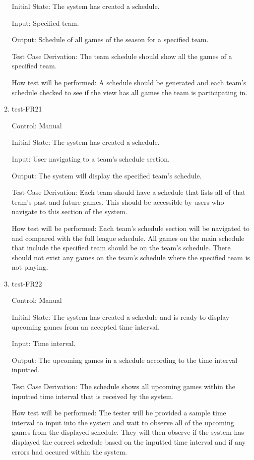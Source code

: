 \documentclass[12pt, titlepage]{article}
\begin{document}
\begin{enumerate}
  Initial State: The system has created a schedule.
            
  Input: Specified team.
            
  Output: Schedule of all games of the season for a specified team.

  Test Case Derivation: The team schedule should show all the games of a specified team.
            
  How test will be performed: A schedule should be generated and each team's schedule checked
  to see if the view has all games the team is participating in.

  \item{test-FR21\\}

  Control: Manual
            
  Initial State: The system has created a schedule.
            
  Input: User navigating to a team's schedule section.
            
  Output: The system will display the specified team's schedule.

  Test Case Derivation: Each team should have a schedule that lists all of
  that team's past and future games. This should be accessible by users who
  navigate to this section of the system.
            
  How test will be performed: Each team's schedule section will be navigated to
  and compared with the full league schedule. All games on the main schedule
  that include the specified team should be on the team's schedule. There should
  not exist any games on the team's schedule where the specified team is not
  playing.

  \item{test-FR22\\}

  Control: Manual
            
  Initial State: The system has created a schedule and is ready to display upcoming games from
  an accepted time interval.
            
  Input: Time interval.
            
  Output: The upcoming games in a schedule according to the time interval inputted.

  Test Case Derivation: The schedule shows all upcoming games within the inputted time interval
  that is received by the system.
            
  How test will be performed: The tester will be provided a sample time interval to input
  into the system and wait to observe all of the upcoming games from the displayed schedule.
  They will then observe if the system has displayed the correct schedule based on the
  inputted time interval and if any errors had occured within the system. 

\end{enumerate}
\end{document}
